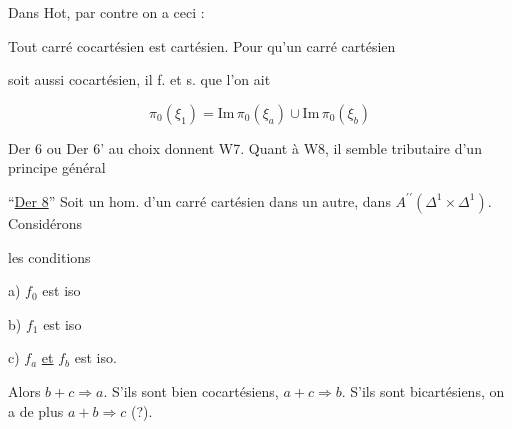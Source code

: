 
Dans Hot, par contre on a ceci :

Tout carré cocartésien est cartésien. Pour qu'un carré cartésien


soit aussi cocartésien, il f. et s. que l'on ait

\[
\pi_0(\xi_1)=\mathrm{Im}\,\pi_0(\xi_a)\cup\mathrm{Im}\,\pi_0(\xi_b)
\]


Der 6 ou Der 6' au choix donnent W7. Quant à W8, il semble tributaire d'un principe général 

``\uline{Der 8}'' Soit un hom. d'un carré cartésien dans un autre, dans $A^{\prime\prime}(\Delta^1\times\Delta^1)$. Considérons


les conditions

a) $f_0$ est iso

b) $f_1$ est iso

c) $f_a$ \uline{et} $f_b$ est iso.

Alors   $b+c\Rightarrow a$. S'ils sont bien cocartésiens, $a+c\Rightarrow b$.  S'ils sont bicartésiens, on a   de plus $a+b\Rightarrow c$ (?).

